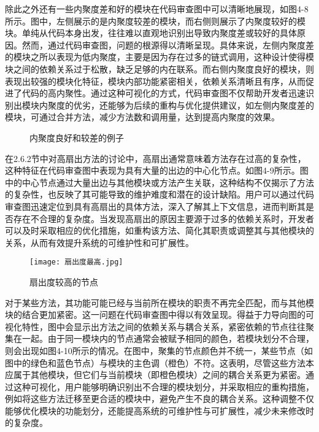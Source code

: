 除此之外还有一些内聚度差和好的模块在代码审查图中可以清晰地展现，如图4-8所示。图中，左侧展示的是内聚度较差的模块，而右侧则展示了内聚度较好的模块。单纯从代码本身出发，往往难以直观地识别出导致内聚度差或较好的具体原因。然而，通过代码审查图，问题的根源得以清晰呈现。具体来说，左侧内聚度差的模块之所以表现为低内聚度，主要是因为存在过多的链式调用，这种设计使得模块之间的依赖关系过于松散，缺乏足够的内在联系。而右侧内聚度良好的模块，则表现出较强的模块化特征，模块内部功能紧密相关，依赖关系清晰且有序，从而促进了代码的高内聚性。通过这种可视化的方式，代码审查图不仅帮助开发者迅速识别出模块内聚度的优劣，还能够为后续的重构与优化提供建议，如左侧内聚度差的模块，可通过合并方法，减少方法数和调用量，达到提高内聚度的效果。

\begin{figure}[!h]
    \setlength{\subfigcapskip}{-1bp}
    \centering
    \begin{minipage}{\textwidth}
    \centering
    \hspace{2em}
    \end{minipage}
    \vspace{0.2em}
    \caption{内聚度良好和较差的例子} %
\end{figure}


在2.6.2节中对高扇出方法的讨论中，高扇出通常意味着方法存在过高的复杂性，这种特征在代码审查图中表现为具有大量的出边的中心化节点。如图4-9所示。图中的中心节点通过大量出边与其他模块或方法产生关联，这种结构不仅揭示了方法的复杂性，也反映了其可能导致的维护难度和潜在的设计缺陷。用户可以通过代码审查图迅速定位到具有高扇出的具体方法，深入了解其上下文信息，进而判断其是否存在不合理的复杂度。当发现高扇出的原因主要源于过多的依赖关系时，开发者可以及时采取相应的优化措施，如重构该方法、简化其职责或调整其与其他模块的关系，从而有效提升系统的可维护性和可扩展性。

\begin{figure}[h]
\centering
\texttt{[image: 扇出度最高.jpg]}
\caption{扇出度较高的节点}
\end{figure}

对于某些方法，其功能可能已经与当前所在模块的职责不再完全匹配，而与其他模块的结合更加紧密。这一问题在代码审查图中得以有效呈现。得益于力导向图的可视化特性，图中会显示出方法之间的依赖关系与耦合关系，紧密依赖的节点往往聚集在一起。由于同一模块内的节点通常会被赋予相同的颜色，若模块划分不合理，则会出现如图4-10所示的情况。在图中，聚集的节点颜色并不统一，某些节点（如图中的绿色和蓝色节点）与模块的主色调（橙色）不符。这表明，尽管这些方法本应属于其他模块，但它们与当前模块（即橙色模块）之间的耦合关系更为紧密。通过这种可视化，用户能够明确识别出不合理的模块划分，并采取相应的重构措施，例如将这些方法迁移至更合适的模块中，避免产生不良的耦合关系。这种调整不仅能够优化模块的功能划分，还能提高系统的可维护性与可扩展性，减少未来修改时的复杂度。



